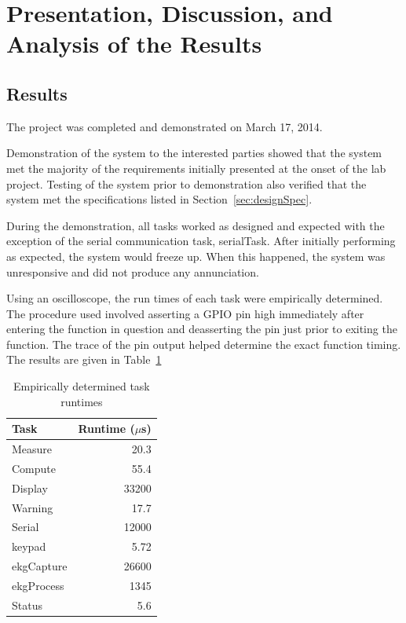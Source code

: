 \documentclass[12pt]{article} %
\begin{document}
    \section{Presentation, Discussion, and Analysis of the Results}

    \subsection{Results} 
    The project was completed and demonstrated on March 17, 2014.

    Demonstration of the system to the interested parties showed that the
    system met the majority of the requirements initially presented at the onset of the lab
    project.  Testing of the system prior to demonstration also verified that
    the system met the specifications listed in Section~\ref{sec:designSpec}.

    During the demonstration, all tasks worked as designed and expected with
    the exception of the serial communication task, serialTask. After initially
    performing as expected, the system would freeze up. When this happened, the
    system was unresponsive and did not produce any annunciation.

    Using an oscilloscope, the run times of each task were empirically
		determined. The procedure used involved asserting a GPIO pin high
		immediately after entering the function in question and deasserting the pin
		just prior to exiting the function. The trace of the pin output helped
		determine the exact function timing. The results are given in
		Table~\ref{tab:taskRuntimes}

    \begin{table}[h]
      \centering
      \begin{tabular}{|l|r|} 
	\hline
	Task & Runtime ($\mu$s) \\ \hline
	Measure & 20.3 \\ \hline
	Compute & 55.4 \\ \hline
	Display & 33200 \\ \hline
	Warning & 17.7 \\ \hline
    Serial & 12000 \\ \hline
    keypad & 5.72 \\ \hline
    ekgCapture & 26600 \\ \hline
    ekgProcess & 1345 \\ \hline
	Status & 5.6 \\ \hline
      \end{tabular}
      \caption{Empirically determined task runtimes}
      \label{tab:taskRuntimes}
    \end{table}
\end{document}
